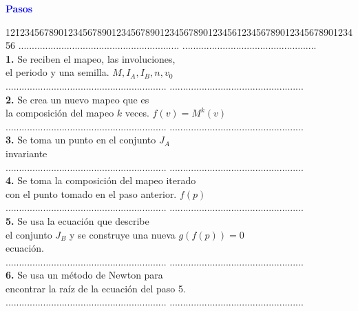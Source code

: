 \begin{center}
	\textcolor{blue}{\textbf{Pasos}}
	\begin{tabbing}
	12\=1234567890123456789012345678901234567890123456\=12345678901234567890123456\kill%
	\>............................................................  \>..................................................\\
	\>\textbf{1.}  Se reciben el mapeo, las involuciones,  \> \\
	\>el periodo y una semilla. \>$M, I_{A}, I_{B},n,v_{0}$ \\
	\>............................................................  \>..................................................\\
	\>\textbf{2.} Se crea un nuevo mapeo que es \> \\
	\> la composición del mapeo $k$ veces.\>  $f(v)=M^{k}(v)$ \\
	\>............................................................  \>..................................................\\
	\>\textbf{3.} Se toma un punto en el conjunto  \> $J_{A}$\\
	\> invariante \> \\
	\>............................................................  \>..................................................\\
	\>\textbf{4.} Se toma la composición del mapeo iterado\> \\
	\> con el punto tomado en el paso anterior.\> $f(p)$\\
	\>............................................................  \>..................................................\\
	\>\textbf{5.} Se usa la ecuación que describe \> \\
	\> el conjunto $J_{B}$ y se construye una nueva \> $g(f(p))=0$\\
	\>ecuación. \> \\
	\>............................................................  \>..................................................\\
	\>\textbf{6.}  Se usa un método de Newton para \> \\
	\> encontrar la raíz de la ecuación del paso 5.\> \\
	\>............................................................  \>..................................................\\
	\end{tabbing} 
\end{center}

